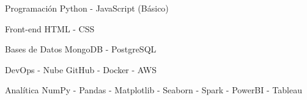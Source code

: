 


\begin{cvskills}


\cvskill
{Programación} %
{Python - JavaScript (Básico)} %


\cvskill
{Front-end} %
{HTML - CSS} %


\cvskill
{Bases de Datos} %
{MongoDB - PostgreSQL} %


\cvskill
{DevOps - Nube} %
{GitHub - Docker - AWS} %


\cvskill
{Analítica} %
{NumPy - Pandas - Matplotlib - Seaborn - Spark - PowerBI - Tableau} %




\end{cvskills}
